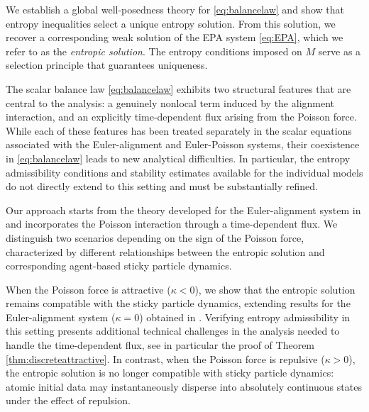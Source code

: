 \documentclass[10pt,a4paper]{amsart}
\begin{document}
	We establish a global well-posedness theory for \eqref{eq:balancelaw} and show that entropy inequalities select a unique entropy solution. From this solution, we recover a corresponding weak solution of the EPA system \eqref{eq:EPA}, which we refer to as the \emph{entropic solution}. The entropy conditions imposed on $M$ serve as a selection principle that guarantees uniqueness.
	
	The scalar balance law \eqref{eq:balancelaw} exhibits two structural features that are central to the analysis: a genuinely nonlocal term induced by the alignment interaction, and an explicitly time-dependent flux arising from the Poisson force. While each of these features has been treated separately in the scalar equations associated with the Euler-alignment and Euler-Poisson systems, their coexistence in \eqref{eq:balancelaw} leads to new analytical difficulties. In particular, the entropy admissibility conditions and stability estimates available for the individual models do not directly extend to this setting and must be substantially refined.
	
	Our approach starts from the theory developed for the Euler-alignment system in \cite{leslie2023sticky} and incorporates the Poisson interaction through a time-dependent flux. We distinguish two scenarios depending on the sign of the Poisson force, characterized by different relationships between the entropic solution and corresponding agent-based sticky particle dynamics. 
	
	When the Poisson force is attractive ($\kappa<0$), we show that the entropic solution remains compatible with the sticky particle dynamics, extending results for the Euler-alignment system ($\kappa=0$) obtained in \cite{leslie2023sticky}. Verifying entropy admissibility in this setting presents additional technical challenges in the analysis needed to handle the time-dependent flux, see in particular the proof of Theorem \ref{thm:discreteattractive}.
	In contrast, when the Poisson force is repulsive ($\kappa>0$), the entropic solution is no longer compatible with sticky particle dynamics: atomic initial data may instantaneously disperse into absolutely continuous states under the effect of repulsion.
	\medskip
	
\end{document}
